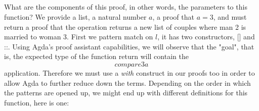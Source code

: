 {\begin{code}%
\>[0]\<%
\\
\>[0]\<%
\\
\>[0]\<%
\\
\>[0]\AgdaSpace{}%
\AgdaSymbol{:}%
\>[461I]\AgdaSymbol{(}\AgdaSpace{}%
\AgdaSymbol{:}\AgdaSpace{}%
\AgdaSpace{}%
\AgdaSymbol{(}\AgdaSpace{}%
\AgdaSpace{}%
\AgdaSymbol{))(}\AgdaSpace{}%
\AgdaSymbol{:}\AgdaSpace{}%
\AgdaSymbol{)}\AgdaSpace{}%
\AgdaSpace{}%
\AgdaSpace{}%
\AgdaSpace{}%
\AgdaSpace{}%
\<%
\\
\>[.]\<[461I]%
\>[4]\AgdaSpace{}%
\AgdaSymbol{(}\AgdaSpace{}%
\AgdaOperator{\AgdaInductiveConstructor{,}}\AgdaSpace{}%
\AgdaSymbol{)}\AgdaSpace{}%
\AgdaSymbol{((}\AgdaSpace{}%
\AgdaOperator{\AgdaInductiveConstructor{,}}\AgdaSpace{}%
\AgdaSymbol{)}\AgdaSpace{}%
\AgdaSpace{}%
\AgdaSymbol{)}\AgdaSpace{}%
\AgdaSpace{}%
\AgdaSymbol{((}\AgdaSpace{}%
\AgdaOperator{\AgdaInductiveConstructor{,}}\AgdaSpace{}%
\AgdaSymbol{)}\AgdaSpace{}%
\AgdaSpace{}%
\AgdaSymbol{)}\<%
\end{code}

What are the components of this proof, in other words, the parameters to this function? We provide a list, a natural number $a$, a proof that $a = 3$, and must return a proof that the operation returns a new list of couples where man 2 is married to woman 3. First we pattern match on $l$, it has two constructors, [] and \:::. Using Agda's proof assistant capabilities, we will observe that the "goal", that is, the expected type of the function return will contain the $$compare 3 a$$ application. Therefore we must use a \emph{with} construct in our proofs too in order to allow Agda to further reduce down the terms. Depending on the order in which the patterns are opened up, we might end up with different definitions for this function, here is one:

}
